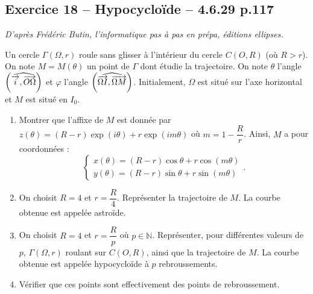 \documentclass[10pt,fleqn]{article} %
\begin{document}
\begin{multicols}{2}
\subsection*{Exercice 18 -- Hypocycloïde -- 4.6.29 p.117}
\begin{flushright}
\textit{D'après Frédéric Butin, l'informatique pas à pas en prépa, éditions ellipses.}
\end{flushright}

Un cercle $ \Gamma\left(\Omega,r\right)$ roule sans glisser à l'intérieur du cercle $C\left(O,R\right)$ (où $R>r$). On note $M=M(\theta)$ un point de $\Gamma$ dont étudie la trajectoire. On note $\theta$ l'angle $\left( \widehat{\overrightarrow{i},\overrightarrow{O\Omega}}\right)$ et $\varphi$ l'angle $\left( \widehat{\overrightarrow{\Omega I},\overrightarrow{\Omega M}}\right)$. Initialement, $\Omega$ est situé sur l'axe horizontal et $M$ est situé en $I_0$.

\begin{center}
\end{center}

\begin{enumerate}
\item Montrer que l'affixe de $M$ est donnée par $z(\theta)=\left(R-r\right) \exp\left(i\theta \right) + r \exp\left(i  m \theta \right)$ où $m=1-\dfrac{R}{r}$. Ainsi, $M$ a pour coordonnées :
$$
\left\{
\begin{array}{l}
x(\theta)= \left(R-r\right) \cos \theta +r \cos \left(m \theta \right) \\
y(\theta)= \left(R-r\right) \sin \theta +r \sin \left(m \theta \right) 
\end{array}
\right. .
$$
\item On choisit $R=4$ et $r=\dfrac{R}{4}$. Représenter la trajectoire de $M$. La courbe obtenue est appelée astroïde. 
\item On choisit $R=4$ et $r=\dfrac{R}{p}$ où $p\in \mathbb{N}$. Représenter, pour différentes valeurs de $p$, $\Gamma\left(\Omega,r\right)$ roulant sur $C\left(O,R\right)$, ainsi que la trajectoire de $M$. La courbe obtenue est appelée hypocycloïde à $p$ rebroussements. 
\item Vérifier que ces points sont effectivement des points de rebroussement.
\end{enumerate}



\end{multicols}
\end{document}
